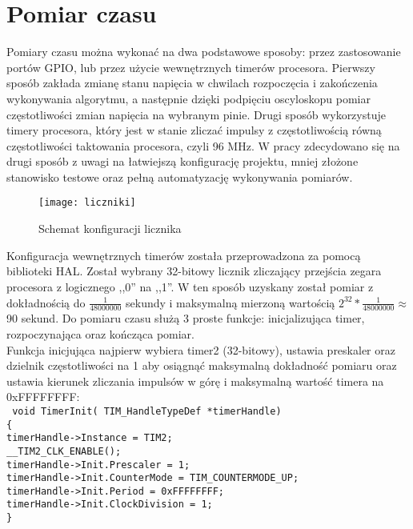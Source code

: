 \documentclass[oneside]{mgr}
\begin{document}
\chapter{Pomiar czasu}
Pomiary czasu można wykonać na dwa podstawowe sposoby: przez zastosowanie portów GPIO, lub przez użycie wewnętrznych timerów procesora. Pierwszy sposób zakłada zmianę stanu napięcia w chwilach rozpoczęcia i zakończenia wykonywania algorytmu, a następnie dzięki podpięciu oscyloskopu pomiar częstotliwości zmian napięcia na wybranym pinie. Drugi sposób wykorzystuje timery procesora, który jest w stanie zliczać impulsy z częstotliwością równą częstotliwości taktowania procesora, czyli 96 MHz. W pracy zdecydowano się na drugi sposób z uwagi na łatwiejszą konfigurację projektu, mniej złożone stanowisko testowe oraz pełną automatyzację wykonywania pomiarów.
\begin{center}
\begin{figure}[h]
\texttt{[image: liczniki]}
\caption{Schemat konfiguracji licznika}
\end{figure}

\end{center}
Konfiguracja wewnętrznych timerów została przeprowadzona za pomocą biblioteki HAL. Został wybrany 32-bitowy licznik zliczający przejścia zegara procesora z logicznego ,,0'' na ,,1''. W ten sposób uzyskany został pomiar z dokładnością do $\frac{1}{48000000}$ sekundy i maksymalną mierzoną wartością $2^{32} * \frac{1}{48000000} \approx$ 90 sekund. Do pomiaru czasu służą 3 proste funkcje: inicjalizująca timer, rozpoczynająca oraz kończąca pomiar.
\\Funkcja inicjująca najpierw wybiera timer2 (32-bitowy), ustawia preskaler oraz dzielnik częstotliwości na 1 aby osiągnąć maksymalną dokładność pomiaru oraz ustawia kierunek zliczania impulsów w górę i maksymalną wartość timera na 0xFFFFFFFF:\\
\texttt{
void TimerInit( TIM\_HandleTypeDef *timerHandle)\\
\{\\
\hspace*{10mm}timerHandle->Instance = TIM2;\\
\hspace*{10mm}\_\_TIM2\_CLK\_ENABLE();\\
\hspace*{10mm}timerHandle->Init.Prescaler = 1;\\
\hspace*{10mm}timerHandle->Init.CounterMode = TIM\_COUNTERMODE\_UP;\\
\hspace*{10mm}timerHandle->Init.Period = 0xFFFFFFFF;\\
\hspace*{10mm}timerHandle->Init.ClockDivision = 1;\\\}\\
}
\end{document}
